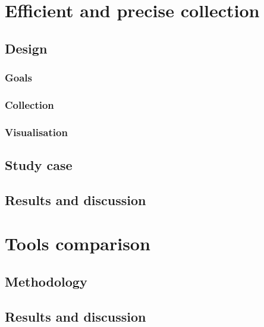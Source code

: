 
\section{Efficient and precise collection}

\subsection{Design}

\subsubsection{Goals}

\subsubsection{Collection}

\subsubsection{Visualisation}

\subsection{Study case}

\subsection{Results and discussion}

\section{Tools comparison}

\subsection{Methodology}


\subsection{Results and discussion}


